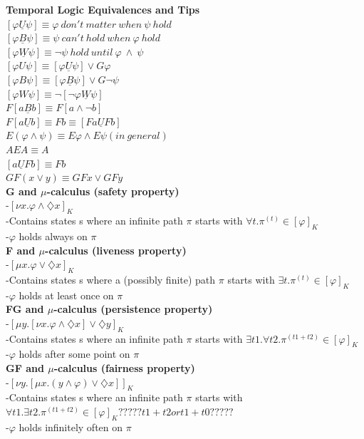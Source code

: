 \documentclass{article}
\begin{document}
\begin{multicols}{4}
\textbf{Temporal Logic Equivalences and Tips} \\
$[\varphi \underline{U} \psi] \equiv \varphi\ don't\ matter\ when\ \psi\ hold $ \\
$[\varphi \underline{B} \psi] \equiv \psi\ can't\ hold\ when\ \varphi\ hold $ \\
$[\varphi \underline{W} \psi] \equiv \neg\psi\ hold\ until\ \varphi\ \wedge\ \psi $ \\
$[\varphi U \psi] \equiv [\varphi \underline{U} \psi] \vee G\varphi$ \\
$[\varphi B \psi] \equiv [\varphi \underline{B} \psi] \vee G\neg\psi$ \\
$[\varphi W \psi] \equiv \neg[\neg\varphi \underline{W} \psi]$ \\
$F[a \underline{B} b] \equiv F[a \wedge \neg b] $ \\
$F[a \underline{U} b] \equiv Fb \equiv [Fa \underline{U} Fb] $ \\
$E(\varphi \wedge \psi) \equiv E\varphi \wedge E \psi (in\ general) $ \\
$AEA \equiv A $ \\
$[a \underline{U} Fb] \equiv Fb $ \\
$GF(x \vee y) \equiv GFx \vee GFy $ \\

\textbf{G and $\mu$-calculus (safety property)} \\
-$[\nu x. \varphi \wedge \diamondsuit x]_{K} $ \\
-Contains states s where an infinite path $\pi$ starts with $\forall t. \pi^{(t)} \in [\varphi]_{K}$ \\
-$\varphi$ holds always on $\pi$ \\
\textbf{F and $\mu$-calculus (liveness property)} \\
-$[\mu x. \varphi \vee \diamondsuit x]_{K} $ \\
-Contains states s where a (possibly finite) path $\pi$ starts with $\exists t. \pi^{(t)} \in [\varphi]_{K}$ \\
-$\varphi$ holds at least once on $\pi$ \\
\textbf{FG and $\mu$-calculus (persistence property)} \\
-$[\mu y.[\nu x. \varphi \wedge \diamondsuit x] \vee \diamondsuit y]_{K} $ \\
-Contains states s where an infinite path $\pi$ starts with $\exists t1.\forall t2. \pi^{(t1+t2)} \in [\varphi]_{K}$ \\
-$\varphi$ holds after some point on $\pi$ \\
\textbf{GF and $\mu$-calculus (fairness property)} \\
-$[\nu y.[\mu x. (y \wedge \varphi) \vee \diamondsuit x]]_{K} $ \\
-Contains states s where an infinite path $\pi$ starts with $\forall t1.\exists t2. \pi^{(t1+t2)} \in [\varphi]_{K} ?????t1+t2 or t1+t0?????$ \\
-$\varphi$ holds infinitely often on $\pi$ \\


\end{multicols}
\end{document}
